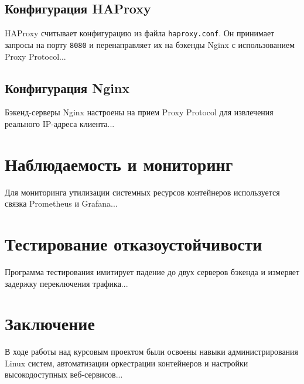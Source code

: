 \documentclass[12pt,a4paper]{article}
\begin{document}
\subsection{Конфигурация HAProxy}
HAProxy считывает конфигурацию из файла \texttt{haproxy.conf}. Он принимает запросы на порту \texttt{8080} и перенаправляет их на бэкенды Nginx с использованием Proxy Protocol...

\subsection{Конфигурация Nginx}
Бэкенд-серверы Nginx настроены на прием Proxy Protocol для извлечения реального IP-адреса клиента...

\section{Наблюдаемость и мониторинг}
Для мониторинга утилизации системных ресурсов контейнеров используется связка Prometheus и Grafana...

\section{Тестирование отказоустойчивости}
Программа тестирования имитирует падение до двух серверов бэкенда и измеряет задержку переключения трафика...

\section{Заключение}
В ходе работы над курсовым проектом были освоены навыки администрирования Linux систем, автоматизации оркестрации контейнеров и настройки высокодоступных веб-сервисов...
\end{document}
